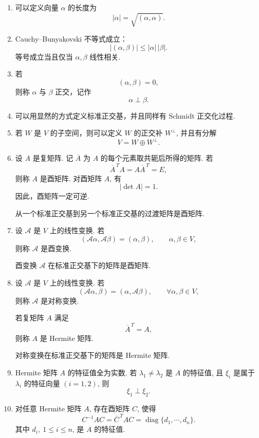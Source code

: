 \begin{enumerate}
	\item 可以定义向量 $\alpha$ 的长度为
	\[
	|\alpha|=\sqrt{(\alpha,\alpha)}.
	\]
	
	\item Cauchy--Bunyakovski 不等式成立：
	\[
	|(\alpha,\beta)|\leq |\alpha|\,|\beta|.
	\]
	等号成立当且仅当 $\alpha,\beta$ 线性相关.
	
	\item 若
	\[
	(\alpha,\beta)=0,
	\]
	则称 $\alpha$ 与 $\beta$ 正交，记作
	\[
	\alpha\perp\beta.
	\]
	
	\item 可以用显然的方式定义标准正交基，并且同样有 Schmidt 正交化过程.
	
	\item 若 $W$ 是 $V$ 的子空间，则可以定义 $W$ 的正交补 $W^\perp$, 并且有分解
	\[
	V=W\oplus W^\perp.
	\]
	
	\item 设 $A$ 是复矩阵. 记 $\overline{A}$ 为 $A$ 的每个元素取共轭后所得的矩阵.
	若
	\[
	\overline{A}^{\,T}A=A\overline{A}^{\,T}=E,
	\]
	则称 $A$ 是酉矩阵. 对酉矩阵 $A$, 有
	\[
	|\det A|=1.
	\]
	因此，酉矩阵一定可逆.
	
	从一个标准正交基到另一个标准正交基的过渡矩阵是酉矩阵.
	
	\item 设 $\mathcal{A}$ 是 $V$ 上的线性变换. 若
	\[
	(\mathcal{A}\alpha,\mathcal{A}\beta)=(\alpha,\beta),
	\qquad \alpha,\beta\in V,
	\]
	则称 $\mathcal{A}$ 是酉变换.
	
	酉变换 $\mathcal{A}$ 在标准正交基下的矩阵是酉矩阵.
	
	\item 设 $\mathcal{A}$ 是 $V$ 上的线性变换. 若
	\[
	(\mathcal{A}\alpha,\beta)=(\alpha,\mathcal{A}\beta),
	\qquad \forall \alpha,\beta\in V,
	\]
	则称 $\mathcal{A}$ 是对称变换.
	
	若复矩阵 $A$ 满足
	\[
	\overline{A}^{\,T}=A,
	\]
	则称 $A$ 是 Hermite 矩阵.
	
	对称变换在标准正交基下的矩阵是 Hermite 矩阵.
	
	\item Hermite 矩阵 $A$ 的特征值全为实数. 若 $\lambda_1\ne \lambda_2$ 是 $A$ 的特征值,
	且 $\xi_i$ 是属于 $\lambda_i$ 的特征向量 $(i=1,2)$, 则
	\[
	\xi_1\perp\xi_2.
	\]
	
	\item 对任意 Hermite 矩阵 $A$, 存在酉矩阵 $C$, 使得
	\[
	C^{-1}AC=\overline{C}^{\,T}AC=\operatorname{diag}\{d_1,\cdots,d_n\}.
	\]
	其中 $d_i,\ 1\leq i\leq n$, 是 $A$ 的特征值.
\end{enumerate}
